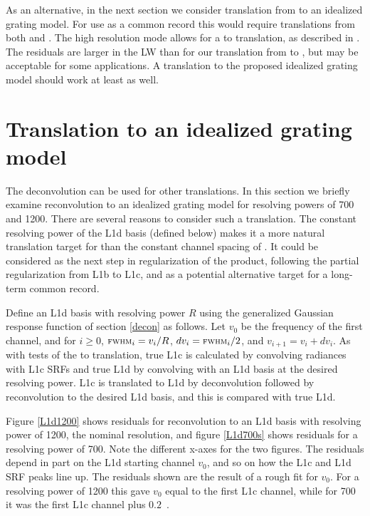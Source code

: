 \documentclass[journal]{IEEEtran}
\begin{document}
As an alternative, in the next section we consider translation from
{\airs} to an idealized grating model.  For use as a common record
this would require translations from both {\airs} and {\cris}.  
The {\cris} high resolution mode allows for a {\cris} to {\airs}
translation, as described in \cite{git:decon}.  The residuals are
larger in the LW than for our translation from {\airs} to {\cris},
but may be acceptable for some applications.  A {\cris} translation
to the proposed idealized grating model should work at least as
well.

\section{Translation to an idealized grating model}
\label{airsL1d}


The {\airs} deconvolution can be used for other translations.  
In this section we briefly examine reconvolution to an idealized
grating model for resolving powers of 700 and 1200.  There are
several reasons to consider such a translation.  The constant
resolving power of the L1d basis (defined below) makes it a more
natural translation target for {\airs} than the constant channel
spacing of {\cris}.  It could be considered as the next step in
regularization of the {\airs} product, following the partial
regularization from L1b to L1c, and as a potential alternative
target for a long-term common record.

Define an {\airs} L1d basis with resolving power $R$ using the
generalized Gaussian response function of section \ref{decon} as
follows.  Let $v_0$ be the frequency of the first channel, and for
$i\ge0$, $\mbox{\small\textsc{fwhm}}_i = v_i / R$, $dv_i = \mbox{\small\textsc{fwhm}}_i / 2$, and $v_{i+1} =
v_i + dv_i$.  As with tests of the {\airs} to {\cris} translation,
true L1c is calculated by convolving {\kcarta} radiances with
{\airs} L1c SRFs and true L1d by convolving with an L1d basis at the
desired resolving power.  L1c is translated to L1d by deconvolution
followed by reconvolution to the desired L1d basis, and this is
compared with true L1d.

Figure \ref{L1d1200} shows residuals for reconvolution to an L1d
basis with resolving power of 1200, the nominal {\airs} resolution,
and figure \ref{L1d700s} shows residuals for a resolving power of
700.  Note the different x-axes for the two figures.  The residuals
depend in part on the L1d starting channel $v_0$, and so on how the
L1c and L1d SRF peaks line up.  The residuals shown are the result
of a rough fit for $v_0$.  For a resolving power of 1200 this gave
$v_0$ equal to the first L1c channel, while for 700 it was the first
L1c channel plus $0.2$~\wn.
\end{document}
